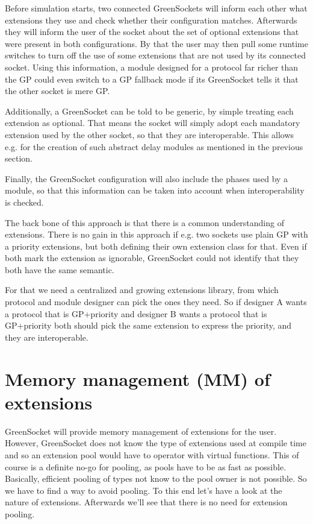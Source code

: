 \documentclass[a4paper,10pt]{article}          %
\begin{document}
Before simulation starts, two connected GreenSockets will inform each other what extensions they use and check whether their configuration matches. Afterwards they will inform the user of the socket about the set of optional extensions that were present in both configurations. By that the user may then pull some runtime switches to turn off the use of some extensions that are not used by its connected socket.
Using this information, a module designed for a protocol far richer than the GP could even switch to a GP fallback mode if its GreenSocket tells it that the other socket is mere GP.

Additionally, a GreenSocket can be told to be generic, by simple treating each extension as optional. That means the socket will simply adopt each mandatory extension used by the other socket, so that they are interoperable. This allows e.g. for the creation of such abstract delay modules as mentioned in the previous section.

Finally, the GreenSocket configuration will also include the phases used by a module, so that this information can be taken into account when interoperability is checked. 

The back bone of this approach is that there is a common understanding of extensions. There is no gain in this approach if e.g. two sockets use plain GP with a priority extensions, but both defining their own extension class for that. Even if both mark the extension as ignorable, GreenSocket could not identify that they both have the same semantic. 

For that we need a centralized and growing extensions library, from which protocol and module designer can pick the ones they need. So if designer A wants a protocol that is GP+priority and designer B wants a protocol that is GP+priority both should pick the same extension to express the priority, and they are interoperable.

\section{Memory management (MM) of extensions}
GreenSocket will provide memory management of extensions for the user. However, GreenSocket does not know the type of extensions used at compile time and so an extension pool would have to operator with virtual functions. This of course is a definite no-go for pooling, as pools have to be as fast as possible. Basically, efficient pooling of types not know to the pool owner is not possible. So we have to find a way to avoid pooling. To this end let's have a look at the nature of extensions. Afterwards we'll see that there is no need for extension pooling.
\end{document}
